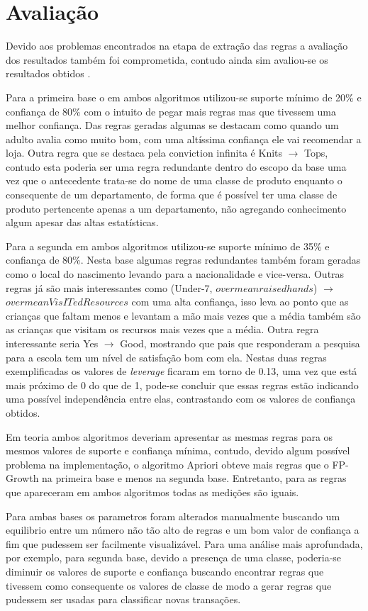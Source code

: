 \section{Avaliação}
Devido aos problemas encontrados na etapa de extração das regras a avaliação dos resultados também foi comprometida, contudo ainda sim avaliou-se os resultados obtidos .

Para a primeira base o em ambos algoritmos utilizou-se suporte mínimo de 20\% e confiança de 80\% com o intuito de pegar mais regras mas que tivessem uma melhor confiança. Das regras geradas algumas se destacam como quando um adulto avalia como muito bom, com uma altíssima confiança ele vai recomendar a loja. Outra regra que se destaca pela conviction infinita é Knits $\rightarrow$ Tops, contudo esta poderia ser uma regra redundante dentro do escopo da base uma vez que o antecedente trata-se do nome de uma classe de produto enquanto o consequente de um departamento, de forma que é possível ter uma classe de produto pertencente apenas a um departamento, não agregando conhecimento algum apesar das altas estatísticas.

Para a segunda em ambos algoritmos utilizou-se suporte mínimo de 35\% e confiança de 80\%. Nesta base algumas regras redundantes também foram geradas como o local do nascimento levando para a nacionalidade e vice-versa. Outras regras já são mais interessantes como (Under-7, $overmeanraisedhands$) $\rightarrow$ $overmeanVisITedResources$ com uma alta confiança, isso leva ao ponto que as crianças que faltam menos e levantam a mão mais vezes que a média também são as crianças que visitam os recursos mais vezes que a média. Outra regra interessante seria Yes $\rightarrow$ Good, mostrando que pais que responderam a pesquisa para a escola tem um nível de satisfação bom com ela. Nestas duas regras exemplificadas os valores de \textit{leverage} ficaram em torno de 0.13, uma vez que está mais próximo de 0 do que de 1, pode-se concluir que essas regras estão indicando uma possível independência entre elas, contrastando com os valores de confiança obtidos.

Em teoria ambos algoritmos deveriam apresentar as mesmas regras para os mesmos valores de suporte e confiança mínima, contudo, devido algum possível problema na implementação, o algoritmo Apriori obteve mais regras que o FP-Growth na primeira base e menos na segunda base. Entretanto, para as regras que apareceram em ambos algoritmos todas as medições são iguais.

Para ambas bases os parametros foram alterados manualmente buscando um equilibrio entre um número não tão alto de regras e um bom valor de confiança a fim que pudessem ser facilmente visualizável. Para uma análise mais aprofundada, por exemplo, para segunda base, devido a presença de uma classe, poderia-se diminuir os valores de suporte e confiança buscando encontrar regras que tivessem como consequente os valores de classe de modo a gerar regras que pudessem ser usadas para classificar novas transações.